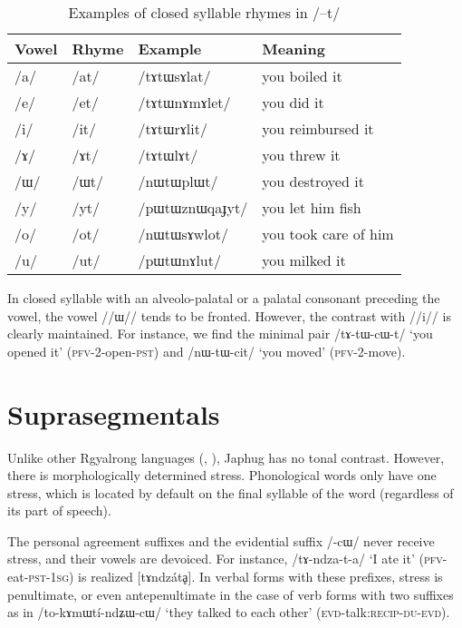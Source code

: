 \documentclass[oldfontcommands,oneside,a4paper,11pt]{article}
\newcommand{\ipa}[1]{/#1/} %
\begin{document}
\begin{table}
 \caption{Examples of closed syllable rhymes in \ipa{--t}} \label{tab:t.rhymes}  \centering
\begin{tabular}{llll}
\toprule
Vowel & Rhyme & Example & Meaning\\
\midrule
\ipa{a} &	   	\ipa{at} &\ipa{tɤtɯsɤlat} &you boiled it\\
\ipa{e} &	  	\ipa{et} &\ipa{tɤtɯnɤmɤlet} & you did it\\
\ipa{i} &	   	\ipa{it} &\ipa{tɤtɯrɤlit} & you reimbursed it\\
\ipa{ɤ} &	   	\ipa{ɤt} &\ipa{tɤtɯlɤt} & you threw it\\
\ipa{ɯ} &	   	\ipa{ɯt} &\ipa{nɯtɯplɯt} & you destroyed it \\
\ipa{y} &	 \ipa{yt} &\ipa{pɯtɯznɯqaɟyt} & you let him fish\\
\ipa{o} & 	\ipa{ot} &\ipa{nɯtɯsɤwlot} & you took care of him\\
\ipa{u} & 	\ipa{ut} & \ipa{pɯtɯnɤlut} & you milked it\\
\bottomrule
\end{tabular}
\end{table}

In closed syllable with an alveolo-palatal or a palatal consonant preceding the vowel, the vowel /\ipa{ɯ}/ tends to be fronted. However, the contrast with /\ipa{i}/ is clearly maintained. For instance, we find the minimal pair \ipa{tɤ-tɯ-cɯ-t} `you opened it' (\textsc{pfv}-2-open-\textsc{pst}) and \ipa{nɯ-tɯ-cit} `you moved' (\textsc{pfv}-2-move).
    
     \section{Suprasegmentals}
Unlike other Rgyalrong languages (\citealt{jackson05yingao}, \citealt{linyj12tone}), Japhug has no tonal contrast. However, there is morphologically determined stress. Phonological words only have one stress, which is located by default on the final syllable of the word (regardless of its part of speech).

The personal agreement suffixes and the evidential suffix \ipa{-cɯ} never receive stress, and their vowels are devoiced. For instance, \ipa{tɤ-ndza-t-a} `I ate it' (\textsc{pfv}-eat-\textsc{pst-1sg}) is realized [tɤndzátḁ]. In verbal forms with these prefixes, stress is penultimate, or even antepenultimate in the case of verb forms with two suffixes as in \ipa{to-kɤmɯtí-ndʑɯ-cɯ} `they talked to each other' (\textsc{evd}-talk:\textsc{recip}-\textsc{du-evd}).
\end{document}
